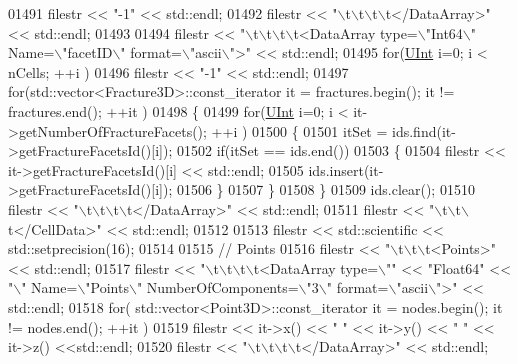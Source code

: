 \begin{DoxyCode}
01491         filestr << \textcolor{stringliteral}{"-1"} << std::endl;
01492     filestr << \textcolor{stringliteral}{"\(\backslash\)t\(\backslash\)t\(\backslash\)t\(\backslash\)t</DataArray>"} << std::endl;
01493 
01494     filestr << \textcolor{stringliteral}{"\(\backslash\)t\(\backslash\)t\(\backslash\)t\(\backslash\)t<DataArray type=\(\backslash\)"Int64\(\backslash\)" Name=\(\backslash\)"facetID\(\backslash\)" format=\(\backslash\)"ascii\(\backslash\)">"} << std::endl;
01495     \textcolor{keywordflow}{for}(\hyperlink{namespaceFVCode3D_a4bf7e328c75d0fd504050d040ebe9eda}{UInt} i=0; i < nCells; ++i )
01496         filestr << \textcolor{stringliteral}{"-1"} << std::endl;
01497     \textcolor{keywordflow}{for}(std::vector<Fracture3D>::const\_iterator it = fractures.begin(); it != fractures.end(); ++it )
01498     \{
01499         \textcolor{keywordflow}{for}(\hyperlink{namespaceFVCode3D_a4bf7e328c75d0fd504050d040ebe9eda}{UInt} i=0; i < it->getNumberOfFractureFacets(); ++i )
01500         \{
01501             itSet = ids.find(it->getFractureFacetsId()[i]);
01502             \textcolor{keywordflow}{if}(itSet == ids.end())
01503             \{
01504                 filestr << it->getFractureFacetsId()[i] << std::endl;
01505                 ids.insert(it->getFractureFacetsId()[i]);
01506             \}
01507         \}
01508     \}
01509     ids.clear();
01510     filestr << \textcolor{stringliteral}{"\(\backslash\)t\(\backslash\)t\(\backslash\)t\(\backslash\)t</DataArray>"} << std::endl;
01511     filestr << \textcolor{stringliteral}{"\(\backslash\)t\(\backslash\)t\(\backslash\)t</CellData>"} << std::endl;
01512 
01513     filestr << std::scientific << std::setprecision(16);
01514 
01515     \textcolor{comment}{// Points}
01516     filestr << \textcolor{stringliteral}{"\(\backslash\)t\(\backslash\)t\(\backslash\)t<Points>"} << std::endl;
01517     filestr << \textcolor{stringliteral}{"\(\backslash\)t\(\backslash\)t\(\backslash\)t\(\backslash\)t<DataArray type=\(\backslash\)""} << \textcolor{stringliteral}{"Float64"} << \textcolor{stringliteral}{"\(\backslash\)" Name=\(\backslash\)"Points\(\backslash\)" NumberOfComponents=\(\backslash\)"3\(\backslash\)"
       format=\(\backslash\)"ascii\(\backslash\)">"} << std::endl;
01518     \textcolor{keywordflow}{for}( std::vector<Point3D>::const\_iterator it = nodes.begin(); it != nodes.end(); ++it )
01519         filestr << it->x() << \textcolor{stringliteral}{" "} << it->y() << \textcolor{stringliteral}{" "} << it->z() <<std::endl;
01520     filestr << \textcolor{stringliteral}{"\(\backslash\)t\(\backslash\)t\(\backslash\)t\(\backslash\)t</DataArray>"} << std::endl;

\end{DoxyCode}
